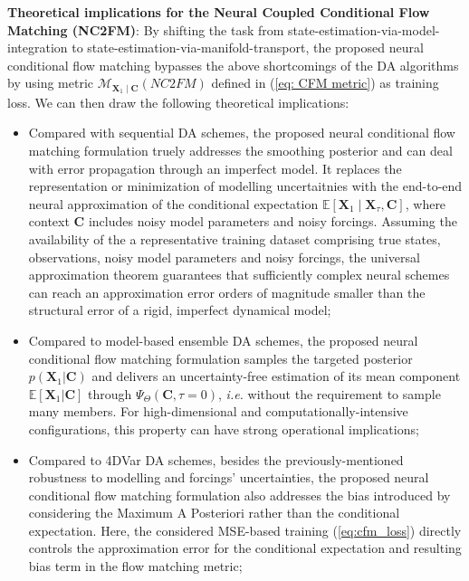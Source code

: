 \documentclass[10pt]{article}
\begin{document}
{\bf Theoretical implications for the Neural Coupled Conditional Flow Matching (NC2FM)}: By shifting the task from state-estimation-via-model-integration to state-estimation-via-manifold-transport, the proposed neural conditional flow matching  bypasses the above shortcomings of the DA algorithms by using metric $\mathcal{M}_{\mathbf{X}_1\mid \mathbf{C}}\left( NC2FM \right)$ defined in (\ref{eq: CFM metric}) as training loss. We can then draw the following theoretical implications:
\begin{itemize}
    \item Compared with sequential DA schemes, the proposed neural conditional flow matching formulation truely addresses the smoothing posterior and can deal with error propagation through an imperfect model. It replaces the representation or minimization of modelling uncertaitnies with the end-to-end neural approximation of the conditional expectation $\mathbb{E}\left [\mathbf{X}_1 \mid \mathbf{X}_\tau,\mathbf{C}\right ]$, where context $\mathbf{C}$ includes noisy model parameters and noisy forcings. Assuming the availability of the a representative training dataset comprising true states, observations, noisy model parameters and noisy forcings, the universal approximation theorem guarantees that sufficiently complex neural schemes can reach an approximation error orders of magnitude smaller than the structural error of a rigid, imperfect dynamical model;
    \item Compared to model-based ensemble DA schemes, the proposed neural conditional flow matching formulation samples the targeted posterior $p(\mathbf{X}_1 | \mathbf{C})$ and delivers an uncertainty-free estimation of its mean component $\mathbb{E}[\mathbf{X}_1 | \mathbf{C}]$ through $\Psi_\Theta(\mathbf{C},\tau=0)$, {\em i.e.} without the requirement to sample many members. For high-dimensional and computationally-intensive configurations, this property can have strong operational implications;
     \item Compared to 4DVar DA schemes, besides the previously-mentioned robustness to modelling and forcings' uncertainties, the proposed neural conditional flow matching formulation also addresses the bias introduced by considering the Maximum A Posteriori rather than the conditional expectation. Here, the considered MSE-based training (\ref{eq:cfm_loss}) directly controls the approximation error for the conditional expectation and resulting bias term in the flow matching metric;
\end{itemize}
\end{document}
